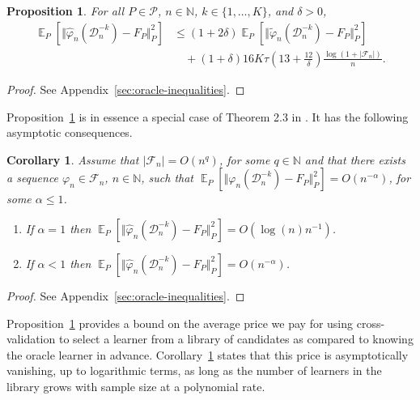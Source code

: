 \documentclass[a4paper,danish]{article}
\theoremstyle{plain} %
\numberwithin{theorem}{section}
\newtheorem{proposition}[theorem]{Proposition}
\newtheorem{corollary}[theorem]{Corollary}
\theoremstyle{definition} %
\theoremstyle{remark}
\DeclareMathOperator{\E}{\mathbb{E}} %
\newcommand{\N}{\mathbb{N}}
\renewcommand{\phi}{\varphi}
\newcommand\bigO{\textit{O}}
\newcommand{\1}{\mathds{1}}
\newcommand{\data}{\ensuremath{\mathcal{D}}}
\begin{document}
\begin{proposition}
  \label{prop:oracle-prop}
  For all \(P\in\mathcal{P}\), \( n \in \N \), \( k \in \{1, \dots, K\} \),
  and $\delta>0$,
  \begin{align*}
    \E_{P}{\left[ \Vert \hat{\phi}_n(\data_n^{-k}) - F_P \Vert_{P}^2 \right]}
    & \leq (1 + 2\delta)
      \E_{P}{\left[ \Vert \tilde{\phi}_n(\data_n^{-k}) - F_P \Vert_{P}^2 \right]}
    \\
    & \quad
      + (1+ \delta) 16   K \tau
      \left(
      13 + \frac{12}{\delta}
      \right)
      \frac{\log(1 + |\mathcal{F}_n|)}{n}.
  \end{align*}
\end{proposition}
\begin{proof}
  See Appendix~\ref{sec:oracle-inequalities}.
\end{proof}
Proposition~\ref{prop:oracle-prop} is in essence a
special case of Theorem 2.3 in \citep{vaart2006oracle}. It 
has the following asymptotic consequences.

\begin{corollary}
  \label{cor:asymp-cons}
  Assume that \( |\mathcal{F}_n| = \bigO(n^q)\), for some \( q \in \N \) and
  that there exists a sequence \( \phi_n \in \mathcal{F}_n \), \( n \in \N \),
  such that
  \( \E_{P}{\left[ \Vert \phi_n(\data_n^{-k}) - F_P \Vert_{P}^2 \right]} =
  \bigO(n^{-\alpha}) \), for some \( \alpha\leq 1 \).
  \begin{enumerate}[label=(\alph*)]
  \item If $\alpha=1$ then
    \( \E_{P}{\left[ \Vert \hat{\phi}_n(\data_n^{-k}) - F_P \Vert_{P}^2
      \right]} = \bigO(\log(n)n^{-1}) \).
  \item If $\alpha<1$ then
    \( \E_{P}{\left[ \Vert \hat{\phi}_n(\data_n^{-k}) - F_P \Vert_{P}^2 \right]} =
    \bigO(n^{-\alpha}) \).
  \end{enumerate}
\end{corollary}
\begin{proof}
  See Appendix~\ref{sec:oracle-inequalities}.
\end{proof}

Proposition~\ref{prop:oracle-prop} provides a bound on the
average price we pay for using cross-validation to select a
learner from a library of candidates as compared to knowing
the oracle learner in advance. Corollary~\ref{cor:asymp-cons}
states that this price is asymptotically vanishing, up to
logarithmic terms, as long as the number of learners in the
library grows with sample size at a polynomial rate.
\end{document}
